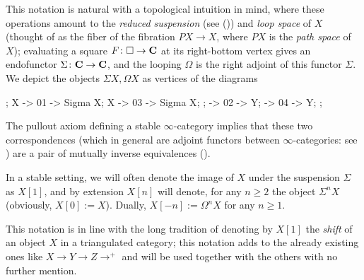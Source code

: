 This notation is natural with a topological intuition in mind, where these operations amount to the \emph{reduced suspension} (see ()) and \emph{loop space} of $X$ (thought of as the fiber of the fibration $PX \to X$, where $PX$ is the \emph{path space} of $X$); evaluating a square $F\colon \square\to \textbf{C}$ at its right\hyp{}bottom vertex gives an endofunctor $\Sigma\colon \textbf{C}\to \textbf{C}$, and the looping $\Omega$ is the right adjoint of this functor $\Sigma$. We depict the objects $\Sigma X, \Omega X$ as vertices of the diagrams
\begin{center}
\begin{kD}
;
\mor X -> 01 -> {Sigma X};
\mor X -> 03 -> {Sigma X};
;
 -> 02 -> Y;
 -> 04 -> Y;
;
\end{kD}
\end{center}
The pullout axiom defining a stable $\infty$\hyp{}category implies that these two correspondences (which in general are adjoint functors between $\infty$\hyp{}categories: see \cite[Remark \textbf{1.1.2.8}]{LurieHA}) are a pair of mutually inverse equivalences (\cite[Prop. \textbf{5.8}]{Gro}).
\begin{notat}\label{shifteggio}
In a stable setting, we will often denote the image of $X$ under the suspension $\Sigma$ as $X[1]$, and by extension $X[n]$ will denote, for any $n\ge 2$ the object $\Sigma^nX$ (obviously, $X[0]:=X$). Dually, $X[-n]:=\Omega^n X$ for any $n\ge 1$.
\end{notat}
This notation is in line with the long tradition of denoting by $X[1]$ the \emph{shift} of an object $X$ in a triangulated category; this notation adds to the already existing ones like $X\to Y\to Z\to^+$ and will be used together with the others with no further mention. 
